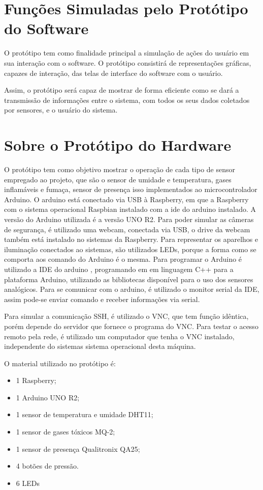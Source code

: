 \section{Funções Simuladas pelo Protótipo do Software}
\par O protótipo tem como finalidade principal a simulação de ações do usuário em sua interação com o software. O protótipo consistirá de representações gráficas, capazes de interação, das telas de interface do software com o usuário.
\par Assim, o protótipo será capaz de mostrar de forma eficiente como se dará a transmissão de informações entre o sistema, com todos os seus dados coletados por sensores, e o usuário do sistema.

\section{Sobre o Protótipo do Hardware}
\par O protótipo tem como objetivo mostrar o operação de cada tipo de sensor empregado ao projeto, que são  o sensor de umidade e temperatura, gases inflamáveis e fumaça, sensor de presença isso implementados ao microcontrolador Arduino. O arduino está conectado via USB à Raspberry, em que a Raspberry com o sistema operacional Raspbian instalado com a ide do arduino instalado. A versão do Arduino utilizada é a versão UNO R2. Para poder simular as câmeras de segurança, é utilizado uma webcam, conectada via USB, o drive da webcam também está instalado no sistemas da Raspberry. Para representar os aparelhos e iluminação conectados ao sistemas, são utilizados LEDs, porque a forma como se comporta aos comando do Arduino é o mesma. Para programar o Arduino é utilizado a IDE do arduino , programando em em  linguagem C++ para a plataforma Arduino, utilizando as bibliotecas disponível para o uso dos sensores analógicos.  Para se comunicar com o arduino, é utilizado o monitor serial da IDE, assim pode-se enviar comando e receber informações via serial.
\par Para simular a comunicação SSH, é utilizado o VNC, que tem função idêntica, porém depende do servidor que fornece o programa do VNC. Para testar o acesso remoto pela rede, é utilizado um computador que tenha o VNC instalado, independente do sistemas sistema operacional desta máquina.
\par O material utilizado no protótipo é:
\begin{itemize}
    \item 1 Raspberry;
    \item 1 Arduino UNO R2;
    \item 1 sensor de temperatura e umidade DHT11;
    \item 1 sensor de gases tóxicos MQ-2;
    \item 1 sensor de presença Qualitronix QA25;
    \item 4 botões de pressão.
    \item 6 LEDs
\end{itemize}

